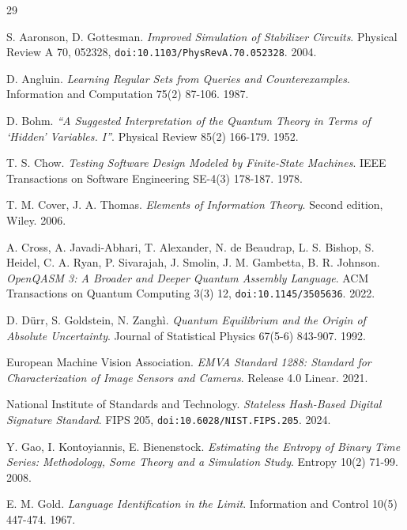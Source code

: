 \backmatter
{}
\begin{thebibliography}{29}

S. Aaronson, D. Gottesman. \emph{Improved Simulation of Stabilizer Circuits}. Physical Review A 70, 052328, \texttt{doi:10.1103/\allowbreak{}PhysRevA.70.052328}. 2004.

D. Angluin. \emph{Learning Regular Sets from Queries and Counterexamples}. Information and Computation 75(2) 87-106. 1987.

D. Bohm. \emph{``A Suggested Interpretation of the Quantum Theory in Terms of `Hidden' Variables. I''}. Physical Review 85(2) 166-179. 1952.

T. S. Chow. \emph{Testing Software Design Modeled by Finite-State Machines}. IEEE Transactions on Software Engineering SE-4(3) 178-187. 1978.

T. M. Cover, J. A. Thomas. \emph{Elements of Information Theory}. Second edition, Wiley. 2006.

A. Cross, A. Javadi-Abhari, T. Alexander, N. de Beaudrap, L. S. Bishop, S. Heidel, C. A. Ryan, P. Sivarajah, J. Smolin, J. M. Gambetta, B. R. Johnson. \emph{OpenQASM 3: A Broader and Deeper Quantum Assembly Language}. ACM Transactions on Quantum Computing 3(3) 12, \texttt{doi:10.1145/\allowbreak{}3505636}. 2022.

D. D\"urr, S. Goldstein, N. Zangh\`i. \emph{Quantum Equilibrium and the Origin of Absolute Uncertainty}. Journal of Statistical Physics 67(5-6) 843-907. 1992.

European Machine Vision Association. \emph{EMVA Standard 1288: Standard for Characterization of Image Sensors and Cameras}. Release 4.0 Linear. 2021.

National Institute of Standards and Technology. \emph{Stateless Hash-Based Digital Signature Standard}. FIPS 205, \texttt{doi:10.6028/\allowbreak{}NIST.FIPS.205}. 2024.

Y. Gao, I. Kontoyiannis, E. Bienenstock. \emph{Estimating the Entropy of Binary Time Series: Methodology, Some Theory and a Simulation Study}. Entropy 10(2) 71-99. 2008.

E. M. Gold. \emph{Language Identification in the Limit}. Information and Control 10(5) 447-474. 1967.


\end{thebibliography}
